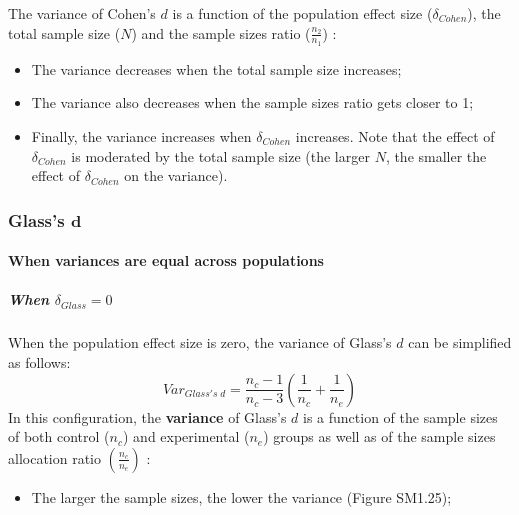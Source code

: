 \documentclass[
  english,
  man,mask,floatsintext]{apa6}
\providecommand{\tightlist}{%
  \setlength{\itemsep}{0pt}\setlength{\parskip}{0pt}}
\let\oldparagraph\paragraph
\renewcommand{\paragraph}[1]{\oldparagraph{#1}\mbox{}}
\let\oldsubparagraph\subparagraph
\renewcommand{\subparagraph}[1]{\oldsubparagraph{#1}\mbox{}}
\begin{document}
The variance of Cohen's \(d\) is a function of the population effect size (\(\delta_{Cohen}\)), the total sample size (\(N\)) and the sample sizes ratio (\(\frac{n_2}{n_1}\)) :

\begin{itemize}
\tightlist
\item
  The variance decreases when the total sample size increases;\\
\item
  The variance also decreases when the sample sizes ratio gets closer to 1;\\
\item
  Finally, the variance increases when \(\delta_{Cohen}\) increases. Note that the effect of \(\delta_{Cohen}\) is moderated by the total sample size (the larger \(N\), the smaller the effect of \(\delta_{Cohen}\) on the variance).
\end{itemize}

\hypertarget{glasss-bmd}{%
\subsubsection{\texorpdfstring{Glass's \(\bm{d}\)}{Glass's \textbackslash bm\{d\}}}\label{glasss-bmd}}

\hypertarget{when-variances-are-equal-across-populations-3}{%
\paragraph{When variances are equal across populations}\label{when-variances-are-equal-across-populations-3}}

\hypertarget{when-delta_glass0}{%
\subparagraph{\texorpdfstring{When \(\delta_{Glass}=0\)}{When \textbackslash delta\_\{Glass\}=0}}\label{when-delta_glass0}}

When the population effect size is zero, the variance of Glass's \(d\) can be simplified as follows:
\[Var_{Glass's \; d} = \frac{n_c-1}{n_c-3} \left( \frac{1}{n_c}+\frac{1}{n_e}\right)\] In this configuration, the \textbf{variance} of Glass's \(d\) is a function of the sample sizes of both control (\(n_c\)) and experimental (\(n_e\)) groups as well as of the sample sizes allocation ratio \(\left( \frac{n_c}{n_e}\right)\) :

\begin{itemize}
\tightlist
\item
  The larger the sample sizes, the lower the variance (Figure SM1.25);
\end{itemize}
\end{document}
